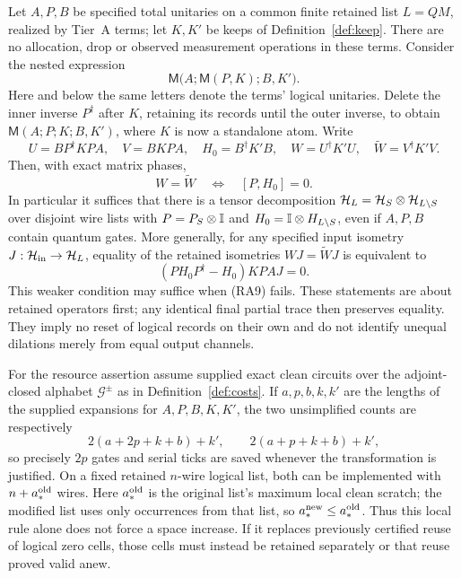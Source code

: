 \begin{theorem}
\label{thm:resA-deletion}
Let $A,P,B$ be specified total unitaries on a common finite retained
list $L=QM$, realized by Tier~A terms; let $K,K'$ be keeps of
Definition~\ref{def:keep}. There are no allocation, drop or observed
measurement operations in these terms. Consider the nested expression
\[
 \mathsf M\bigl(A;\mathsf M(P,K);B,K'\bigr).
\]
Here and below the same letters denote the terms' logical unitaries.
Delete the inner inverse $P^\dagger$ after $K$, retaining its records
until the outer inverse, to obtain $\mathsf M(A;P;K;B,K')$, where
$K$ is now a standalone atom. Write
\[
 U=BP^\dagger KPA,\quad V=BKPA,\quad H_0=B^\dagger K'B,
 \quad W=U^\dagger K'U,\quad \widetilde W=V^\dagger K'V.
\]
Then, with exact matrix phases,
\[
 W=\widetilde W\quad\Longleftrightarrow\quad
 [P,H_0]=0.                                          \tag{RA9}
\]
In particular it suffices that there is a tensor decomposition
$\mathcal{H}_L=\mathcal{H}_S\otimes\mathcal{H}_{L\setminus S}$ over disjoint wire lists
with $P=P_S\otimes\mathbb{I}$ and $H_0=\mathbb{I}\otimes H_{L\setminus S}$,
even if $A,P,B$ contain quantum gates. More generally,
for any specified input isometry $J:\mathcal{H}_{\rm in}\to\mathcal{H}_L$,
equality of the retained isometries $WJ=\widetilde WJ$ is equivalent to
\[
 (PH_0P^\dagger-H_0)KPAJ=0.                          \tag{RA10}
\]
This weaker condition may suffice when (RA9) fails. These statements
are about retained operators first; any identical final partial trace
then preserves equality. They imply no reset of logical records on
their own and do not identify unequal dilations merely from equal
output channels.

For the resource assertion assume supplied exact clean circuits over
the adjoint-closed alphabet $\mathcal G^{\pm}$ as in
Definition~\ref{def:costs}. If $a,p,b,k,k'$ are the lengths of the
supplied expansions for $A,P,B,K,K'$, the two unsimplified counts are respectively
\[
 2(a+2p+k+b)+k',\qquad 2(a+p+k+b)+k',                 \tag{RA11}
\]
so precisely $2p$ gates and serial ticks are saved whenever the
transformation is justified. On a fixed retained $n$-wire logical list,
both can be implemented with $n+a_*^{\rm old}$ wires. Here
$a_*^{\rm old}$ is the original list's maximum local clean scratch;
the modified list uses only occurrences from that list, so
$a_*^{\rm new}\leq a_*^{\rm old}$.
Thus this local rule alone does not force a space increase. If it
replaces previously certified reuse of logical zero cells, those cells
must instead be retained separately or that reuse proved valid anew.
\end{theorem}
